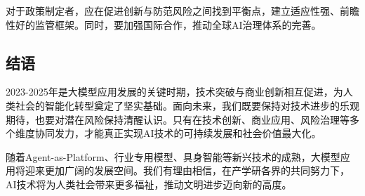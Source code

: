 \documentclass{article}
\begin{document}
对于政策制定者，应在促进创新与防范风险之间找到平衡点，建立适应性强、前瞻性好的监管框架。同时，要加强国际合作，推动全球AI治理体系的完善。

\subsection{结语}
2023-2025年是大模型应用发展的关键时期，技术突破与商业创新相互促进，为人类社会的智能化转型奠定了坚实基础。面向未来，我们既要保持对技术进步的乐观期待，也要对潜在风险保持清醒认识。只有在技术创新、商业应用、风险治理等多个维度协同发力，才能真正实现AI技术的可持续发展和社会价值最大化。

随着Agent-as-Platform、行业专用模型、具身智能等新兴技术的成熟，大模型应用将迎来更加广阔的发展空间。我们有理由相信，在产学研各界的共同努力下，AI技术将为人类社会带来更多福祉，推动文明进步迈向新的高度。
\end{document}
